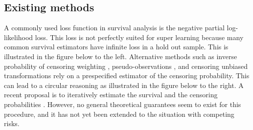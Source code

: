 \documentclass[a0,portrait]{a0poster}
\newcommand{\1}{\mathds{1}}
\begin{document}
\begin{minipage}{\textwidth}
\begin{minipage}[t]{1\linewidth}
\begin{multicols}{2}




\vspace{-2em}

\section*{Existing methods}

A commonly used loss function in survival analysis is the negative
partial log-likelihood loss. This loss is not perfectly suited for
super learning because many common survival estimators have infinite
loss in a hold out sample. This is illustrated in the figure below to
the left. Alternative methods such as inverse probability of censoring
weighting \cite{graf1999assessment,gonzalez2021stacked},
pseudo-observations \cite{andersen2003generalised,sachs2019ensemble},
and censoring unbiased transformations
\cite{steingrimsson2019censoring} rely on a prespecified estimator of
the censoring probability. This can lead to a circular reasoning as
illustrated in the figure below to the right. A recent proposal is to
iteratively estimate the survival and the censoring probabilities
\cite{westling2021inference}. However, no general theoretical guarantees
seem to exist for this procedure, and it has not yet been extended to
the situation with competing risks.



\end{multicols}
\end{minipage}
\end{minipage}
\end{document}
